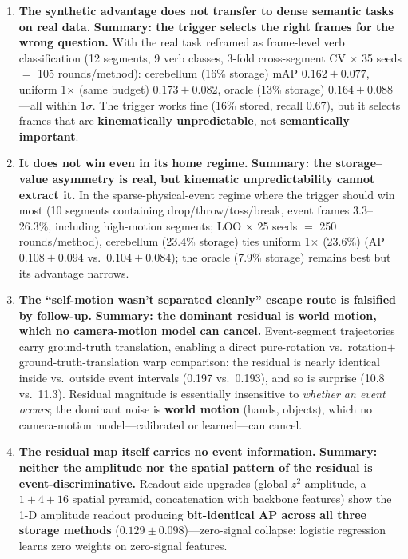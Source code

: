 \documentclass[12pt,a4paper]{article}
\begin{document}
\begin{enumerate}
  \item \textbf{The synthetic advantage does not transfer to dense semantic tasks on real data.}
  \textbf{Summary: the trigger selects the right frames for the wrong question.}
  With the real task reframed as frame-level verb classification (12 segments, 9 verb classes, 3-fold cross-segment CV $\times$ 35 seeds $=$ 105 rounds/method): cerebellum (16\% storage) mAP $0.162{\pm}0.077$, uniform 1$\times$ (same budget) $0.173{\pm}0.082$, oracle (13\% storage) $0.164{\pm}0.088$---all within $1\sigma$. The trigger works fine (16\% stored, recall 0.67), but it selects frames that are \textbf{kinematically unpredictable}, not \textbf{semantically important}.
  \item \textbf{It does not win even in its home regime.}
  \textbf{Summary: the storage--value asymmetry is real, but kinematic unpredictability cannot extract it.}
  In the sparse-physical-event regime where the trigger should win most (10 segments containing drop/throw/toss/break, event frames 3.3--26.3\%, including high-motion segments; LOO $\times$ 25 seeds $=$ 250 rounds/method), cerebellum (23.4\% storage) ties uniform 1$\times$ (23.6\%) (AP $0.108{\pm}0.094$ vs.\ $0.104{\pm}0.084$); the oracle (7.9\% storage) remains best but its advantage narrows.
  \item \textbf{The ``self-motion wasn't separated cleanly'' escape route is falsified by follow-up.}
  \textbf{Summary: the dominant residual is world motion, which no camera-motion model can cancel.}
  Event-segment trajectories carry ground-truth translation, enabling a direct pure-rotation vs.\ rotation$+$ground-truth-translation warp comparison: the residual is nearly identical inside vs.\ outside event intervals (0.197 vs.\ 0.193), and so is surprise (10.8 vs.\ 11.3). Residual magnitude is essentially insensitive to \emph{whether an event occurs}; the dominant noise is \textbf{world motion} (hands, objects), which no camera-motion model---calibrated or learned---can cancel.
  \item \textbf{The residual map itself carries no event information.}
  \textbf{Summary: neither the amplitude nor the spatial pattern of the residual is event-discriminative.}
  Readout-side upgrades (global $z^2$ amplitude, a $1{+}4{+}16$ spatial pyramid, concatenation with backbone features) show the 1-D amplitude readout producing \textbf{bit-identical AP across all three storage methods} ($0.129{\pm}0.098$)---zero-signal collapse: logistic regression learns zero weights on zero-signal features.

\end{enumerate}
\end{document}
